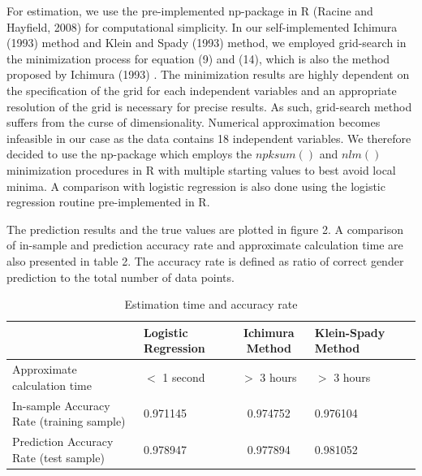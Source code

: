 \documentclass[a4paper]{article}
\begin{document}
For estimation, we use the pre-implemented np-package in R (Racine and Hayfield, 2008) \cite{[28]} for computational simplicity. In our self-implemented Ichimura (1993) method \cite{[6]} and Klein and Spady (1993) \cite{[12]} method, we employed grid-search in the minimization process for equation (9) and (14), which is also the method proposed by Ichimura (1993) \cite{[6]}. The minimization results are highly dependent on the specification of the grid for each independent variables and an appropriate resolution of the grid is necessary for precise results. As such, grid-search method suffers from the curse of dimensionality. Numerical approximation becomes infeasible in our case as the data contains 18 independent variables. We therefore decided to use the np-package which employs the $npksum()$ and $nlm()$ minimization procedures in R with multiple starting values to best avoid local minima. A comparison with logistic regression is also done using the logistic regression routine pre-implemented in R. 

The prediction results and the true values are plotted in figure 2. A comparison of in-sample and prediction accuracy rate and approximate calculation time are also presented in table 2. The accuracy rate is defined as ratio of correct gender prediction to the total number of data points.

\begin{table}
    \centering
	\begin{center}
	\begin{tabular}{  m{2cm} | m{3cm} c m{3cm} c m{3cm} |}
	  & Logistic Regression & Ichimura Method & Klein-Spady Method

	\tabularnewline
	\midrule

	Approximate calculation time & $<$ 1 second & $>$ 3 hours & $>$ 3 hours
	\tabularnewline
	\midrule

	In-sample Accuracy Rate (training sample) & 0.971145 & 0.974752 & 0.976104
	\tabularnewline
	\midrule

	Prediction Accuracy Rate (test sample) & 0.978947 &  0.977894 & 0.981052 
	\tabularnewline
	\bottomrule
	\end{tabular}
	\end{center}
	\caption {Estimation time and accuracy rate}
\end{table}

\bigskip
\bigbreak
\end{document}
